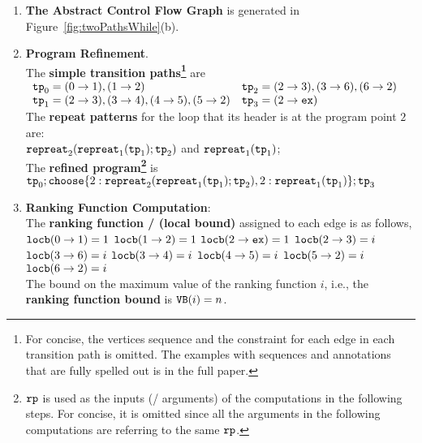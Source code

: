 \begin{enumerate}
  \item  \textbf{The Abstract Control Flow Graph} is generated in Figure~\ref{fig:twoPathsWhile}(b).

  \item \textbf{Program Refinement}. 
  \\
  The \textbf{simple transition paths\footnote{For concise, the vertices sequence and the constraint for each edge in each transition path is omitted.
  The examples with sequences and annotations that are fully spelled out is in the full paper.}} are
  \\
$
    \begin{array}{ll}
\mathtt{tp}_0 = (0 \to 1), (1 \to 2)
&
\mathtt{tp}_2 = (2 \to 3), (3 \to 6), (6 \to 2)
\\
\mathtt{tp}_1 = (2 \to 3), (3 \to 4), (4 \to 5), (5 \to 2)
&
\mathtt{tp}_3 = (2 \to \mathtt{ex})
\end{array}
$
\\
The \textbf{repeat patterns}
for the loop that its header is
at the program point 
$2$ are:
\\
$\mathtt{repreat}_2(\mathtt{repreat}_1(\mathtt{tp}_1); \mathtt{tp}_2) $
and $\mathtt{repreat}_1(\mathtt{tp}_1)$; 
\\
The \textbf{refined program\footnote{$\mathtt{rp}$ is used as the inputs (/ arguments) of the computations in the following steps.
For concise, it is omitted since all the arguments in the following computations are referring to the same $\mathtt{rp}$.}} is
\\
$
  \tpath_0 ; \rpchoose{2: \rprepeat_2(\rprepeat_1(\tpath_1); \tpath_2) , 
  2: \rprepeat_1(\tpath_1) }; \tpath_3
$
\item \textbf{Ranking Function Computation}:
\\
  The \textbf{ranking function / (local bound)}  assigned to each edge is as follows,
    \\  
      $\mathtt{locb}(0 \to 1) = 1$ 
      \quad
      $\mathtt{locb}(1 \to 2) = 1$ 
      \quad
      $\mathtt{locb}(2 \to \mathtt{ex}) = 1$ 
      \quad $\mathtt{locb}(2 \to 3) = i$ 
      \quad $\mathtt{locb}(3 \to 6) = i$ 
      \quad $\mathtt{locb}(3 \to 4) = i$ 
      \quad $\mathtt{locb}(4 \to 5) = i$ 
      \quad $\mathtt{locb}(5 \to 2) = i$ 
      \quad $\mathtt{locb}(6 \to 2) = i$ 
      \\
  The bound on the maximum value of the ranking function $i$, i.e., the \textbf{ranking function bound} is
    ${\mathtt{VB}}(i) = n$.

\end{enumerate}
